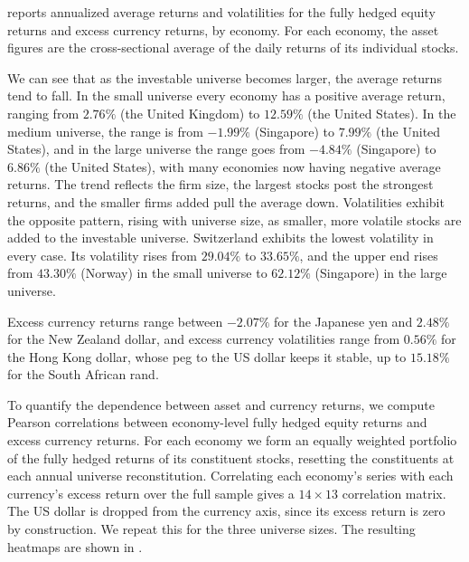  reports annualized average returns and volatilities for the
fully hedged equity returns and excess currency returns, by economy. For each economy, the
asset figures are the cross-sectional average of the daily returns of its individual
stocks. 

We can see that as the investable universe becomes larger, the average returns tend to fall. In the small universe every economy has a positive average return, ranging from
$2.76\%$ (the United Kingdom) to $12.59\%$ (the United States). In the medium universe, the range
is from $-1.99\%$ (Singapore) to $7.99\%$ (the United States), and in the
large universe the range goes from $-4.84\%$ (Singapore) to $6.86\%$ (the United States), with many
economies now having negative average returns. The
trend reflects the firm size, the largest stocks post the strongest returns, and the smaller
firms added pull the average down.
Volatilities exhibit the opposite pattern, rising with universe size, as smaller, more
volatile stocks are added to the investable universe. Switzerland exhibits the lowest volatility in every case.
Its volatility rises from $29.04\%$ to $33.65\%$, and the upper end rises 
from $43.30\%$ (Norway) in the small universe to $62.12\%$ (Singapore) in the large universe.

Excess currency returns range between $-2.07\%$ for the Japanese yen and $2.48\%$ for the New
Zealand dollar, and excess currency volatilities range from $0.56\%$ for the Hong Kong
dollar, whose peg to the US dollar keeps it stable, up to $15.18\%$ for the
South African rand.

To quantify the dependence between asset and currency returns, we compute Pearson
correlations between economy-level fully hedged equity returns and excess currency returns.
For each economy we form an equally weighted portfolio of the fully hedged returns of
its constituent stocks, resetting the constituents at each annual universe reconstitution. 
Correlating each economy's series
with each currency's excess return over the full sample gives a $14 \times 13$ correlation matrix. The
US dollar is dropped from the currency axis, since its excess return is zero by
construction. We repeat this for the three universe sizes.
The resulting heatmaps are shown in .

